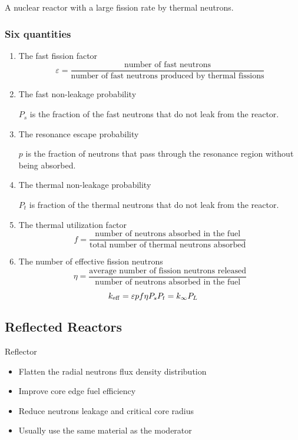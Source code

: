 \begin{definition}
    A nuclear reactor with a large fission rate by thermal neutrons.
\end{definition}

\subsubsection*{Six quantities}

\begin{enumerate}
    \item The fast fission factor
    \begin{equation}
        \varepsilon = \frac{\text{number of fast neutrons}}{\text{number of fast neutrons produced by thermal fissions}}
    \end{equation}
    \item The fast non-leakage probability
    
    $P_s$ is the fraction of the fast neutrons that do not leak from the reactor.
    \item The resonance escape probability
    
    $p$ is the fraction of neutrons that pass through the resonance region without being absorbed.
    \item The thermal non-leakage probability
    
    $P_t$ is fraction of the thermal neutrons that do not leak from the reactor.
    \item The thermal utilization factor
    \begin{equation}
        f = \frac{\text{number of neutrons absorbed in the fuel}}{\text{total number of thermal neutrons absorbed}}
    \end{equation}
    \item The number of effective fission neutrons
    \begin{equation}
        \eta = \frac{\text{average number of fission neutrons released}}{\text{number of neutrons absorbed in the fuel}}
    \end{equation}
\end{enumerate}

\begin{equation}
    k_{\rm eff} = \varepsilon p f \eta P_s P_t = k_{\infty} P_L
\end{equation}

\subsection{Reflected Reactors}

Reflector
\begin{itemize}
    \item Flatten the radial neutrons flux density distribution
    \item Improve core edge fuel efficiency
    \item Reduce neutrons leakage and critical core radius
    \item Usually use the same material as the moderator
\end{itemize}